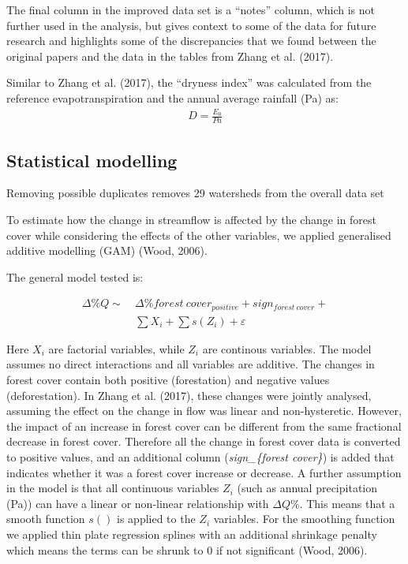 \documentclass[]{elsarticle} %
\begin{document}
The final column in the improved data set is a ``notes'' column, which
is not further used in the analysis, but gives context to some of the
data for future research and highlights some of the discrepancies that
we found between the original papers and the data in the tables from
Zhang et al. (2017).

Similar to Zhang et al. (2017), the ``dryness index'' was calculated
from the reference evapotranspiration and the annual average rainfall
(Pa) as: \[\tag{1}
\begin{aligned}
D = \frac{E_{0}}{Pa}
\end{aligned}\]

\hypertarget{statistical-modelling}{%
\subsection{Statistical modelling}\label{statistical-modelling}}

Removing possible duplicates removes 29 watersheds from the overall data
set

To estimate how the change in streamflow is affected by the change in
forest cover while considering the effects of the other variables, we
applied generalised additive modelling (GAM) (Wood, 2006).

The general model tested is:

\[\tag{2}
\begin{aligned}
\Delta \% Q \sim ~ &\Delta \% forest~cover_{positive} + sign_{forest~cover} + \\ & \sum{X_i} + \sum{s(Z_i)} + \varepsilon
\end{aligned}\]

Here \(X_i\) are factorial variables, while \(Z_i\) are continous
variables. The model assumes no direct interactions and all variables
are additive. The changes in forest cover contain both positive
(forestation) and negative values (deforestation). In Zhang et al.
(2017), these changes were jointly analysed, assuming the effect on the
change in flow was linear and non-hysteretic. However, the impact of an
increase in forest cover can be different from the same fractional
decrease in forest cover. Therefore all the change in forest cover data
is converted to positive values, and an additional column
(\emph{sign\_\{forest cover\}}) is added that indicates whether it was a
forest cover increase or decrease. A further assumption in the model is
that all continuous variables \(Z_i\) (such as annual precipitation
(Pa)) can have a linear or non-linear relationship with \(\Delta Q \%\).
This means that a smooth function \(s()\) is applied to the \(Z_i\)
variables. For the smoothing function we applied thin plate regression
splines with an additional shrinkage penalty which means the terms can
be shrunk to 0 if not significant (Wood, 2006).
\end{document}
